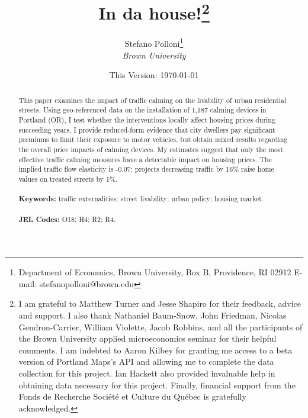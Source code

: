 \documentclass[12pt]{article}
\begin{document}
\begin{titlepage}
\title{In da house!\thanks{I am grateful to Matthew Turner and Jesse Shapiro for their feedback, advice and support. I also thank Nathaniel Baum-Snow, John Friedman, Nicolas Gendron-Carrier, William Violette, Jacob Robbins, and all the participants of the Brown University applied microeconomics seminar for their helpful comments. I am indebted to Aaron Kilbey for granting me access to a beta version of Portland Maps's API and allowing me to complete the data collection for this project. Ian Hackett also provided invaluable help in obtaining data necessary for this project. Finally, financial support from the Fonds de Recherche Soci\'et\'e et Culture du Qu\'ebec is gratefully acknowledged.}}
\vspace{2mm}
\author{Stefano Polloni\thanks{Department of Economics, Brown University, Box B, Providence, RI 02912  E-mail: stefano\textunderscore polloni@brown.edu}\\[-0.4em] \normalsize{\it Brown University}\\}
\vspace{30mm}
\date{\vspace{5mm}This Version: \today}
\maketitle
\begin{abstract}
\noindent This paper examines the impact of traffic calming on the livability of urban residential streets. Using geo-referenced data on the installation of 1,187 calming devices in Portland (OR), I test whether the interventions locally affect housing prices during succeeding years. I provide reduced-form evidence that city dwellers pay significant premiums to limit their exposure to motor vehicles, but obtain mixed results regarding the overall price impacts of calming devices. My estimates suggest that only the most effective traffic calming measures have a detectable impact on housing prices. The implied traffic flow elasticity is -0.07: projects decreasing traffic by 16\% raise home values on treated streets by 1\%. \\
\vspace{0in}\\
\noindent\textbf{Keywords:} traffic externalities; street livability; urban policy; housing market.\\
\vspace{0in}\\
\noindent\textbf{JEL Codes:} O18; H4; R2; R4.\\

\bigskip
\end{abstract}
\setcounter{page}{0}
\thispagestyle{empty}
\end{titlepage}
\pagebreak \newpage
\end{document}
